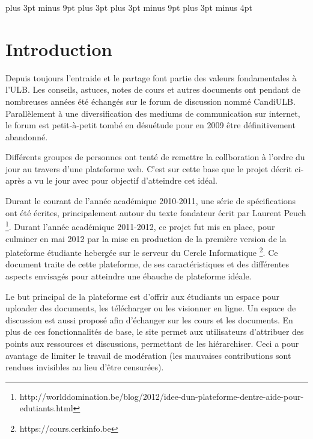 \documentclass[a4paper,12pt]{article}
\begin{document}
\setlength{\footskip}{40pt}

\abovedisplayskip=9pt plus 3pt minus 9pt
\abovedisplayshortskip=6pt plus 3pt
\belowdisplayskip=9pt plus 3pt minus 9pt
\belowdisplayshortskip=9pt plus 3pt minus 4pt
\setlength{\parskip}{0.5ex plus 0.2ex minus 0.2ex}
\setlength{\parindent}{0pt}

\newpage
\setlength{\voffset}{0pt}
\setcounter{tocdepth}{2}
\tableofcontents

\newpage

\section{Introduction}

Depuis toujours l'entraide et le partage font partie des valeurs fondamentales à l'ULB.
Les conseils, astuces, notes de cours et autres documents ont pendant de
nombreuses années été échangés sur le forum de discussion nommé CandiULB.
Parallèlement à une diversification des mediums de communication sur internet,
le forum est petit-à-petit tombé en désuétude pour en 2009 être définitivement abandonné.

Différents groupes de personnes ont tenté de remettre la collboration à l'ordre du jour 
au travers d'une plateforme web. C'est sur cette base que le projet décrit ci-après a vu
le jour avec pour objectif d'atteindre cet idéal.

Durant le courant de l'année académique 2010-2011, une série de spécifications ont été écrites,
principalement autour du texte fondateur écrit par Laurent Peuch
\footnote{http://worlddomination.be/blog/2012/idee-dun-plateforme-dentre-aide-pour-edutiants.html}.
Durant l'année académique 2011-2012, ce projet fut mis en place, pour culminer en mai 2012
par la mise en production de la première version de la plateforme étudiante hebergée sur le serveur du Cercle Informatique
\footnote{https://cours.cerkinfo.be}. Ce document traite de cette plateforme, de ses caractéristiques et des différentes
aspects envisagés pour atteindre une ébauche de plateforme idéale.

Le but principal de la plateforme est d'offrir aux étudiants un espace pour uploader
des documents, les télécharger ou les visionner en ligne. Un espace de discussion est aussi proposé
afin d'échanger sur les cours et les documents. En plus de ces fonctionnalités de base,
le site permet aux utilisateurs d'attribuer des points aux ressources et discussions,
permettant de les hiérarchiser. Ceci a pour avantage de limiter le travail de modération (les mauvaises
contributions sont rendues invisibles au lieu d'être censurées).
\end{document}
